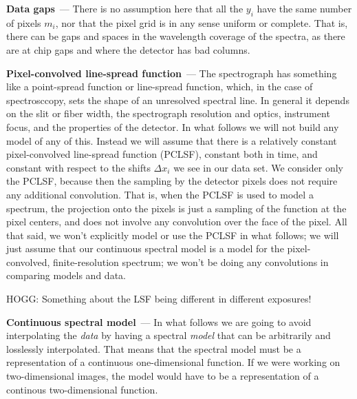 \documentclass[11pt]{article}
\renewcommand{\paragraph}[1]{\medskip\par\noindent\textbf{#1}~---}
\begin{document}
\paragraph{Data gaps}
There is no assumption here that all the $y_i$ have the same number of pixels $m_i$, nor that the pixel grid is in any sense uniform or complete.
That is, there can be gaps and spaces in the wavelength coverage of the spectra, as there are at chip gaps and where the detector has bad columns.

\paragraph{Pixel-convolved line-spread function}
The spectrograph has something like a point-spread function or line-spread function, which, in the case of spectrosccopy, sets the shape of an unresolved spectral line.
In general it depends on the slit or fiber width, the spectrograph resolution and optics, instrument focus, and the properties of the detector.
In what follows we will not build any model of any of this.
Instead we will assume that there is a relatively constant pixel-convolved line-spread function (PCLSF), constant both in time, and constant with respect to the shifts $\Delta x_i$ we see in our data set.
We consider only the PCLSF, because then the sampling by the detector pixels does not require any additional convolution.
That is, when the PCLSF is used to model a spectrum, the projection onto the pixels is just a sampling of the function at the pixel centers, and does not involve any convolution over the face of the pixel.
All that said, we won't explicitly model or use the PCLSF in what follows; we will just assume that our continuous spectral model is a model for the pixel-convolved, finite-resolution spectrum; we won't be doing any convolutions in comparing models and data.

HOGG: Something about the LSF being different in different exposures!

\paragraph{Continuous spectral model}
In what follows we are going to avoid interpolating the \emph{data} by having a spectral \emph{model} that can be arbitrarily and losslessly interpolated.
That means that the spectral model must be a representation of a continuous one-dimensional function.
If we were working on two-dimensional images, the model would have to be a representation of a continous two-dimensional function.
\end{document}
